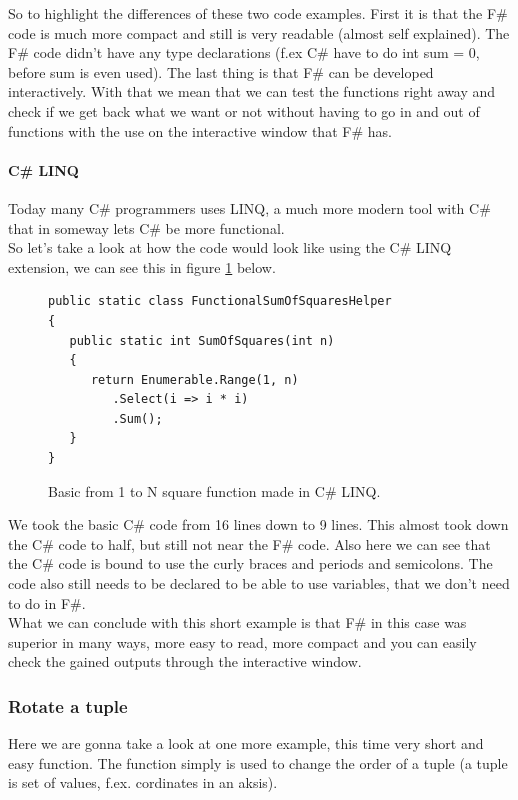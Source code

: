 \documentclass[12pt, a4paper]{article}
\begin{document}
So to highlight the differences of these two code examples. First it is that the F\# code is much more compact and still is very readable (almost self explained). The F\# code didn't have any type declarations (f.ex C\# have to do int sum = 0, before sum is even used). The last thing is that F\# can be developed interactively. With that we mean that we can test the functions right away and check if we get back what we want or not without having to go in and out of functions with the use on the interactive window that F\# has.

\newpage

\paragraph{C\# LINQ}
Today many C\# programmers uses LINQ, a much more modern tool with C\# that in someway lets C\# be more functional.\\

So let’s take a look at how the code would look like using the C\# LINQ extension, we can see this in figure \ref{fig:SquareFunctionCSharpLINQ} below.

\begin{figure}[!h]
\begin{lstlisting}
public static class FunctionalSumOfSquaresHelper
{
   public static int SumOfSquares(int n)
   {
      return Enumerable.Range(1, n)
         .Select(i => i * i)
         .Sum();
   }
}
\end{lstlisting}
\caption{Basic from 1 to N square function made in C\# LINQ.}
\label{fig:SquareFunctionCSharpLINQ}
\end{figure}

We took the basic C\# code from 16 lines down to 9 lines. This almost took down the C\# code to half, but still not near the F\# code. Also here we can see that the C\# code is bound to use the  curly braces and periods and semicolons. The code also still needs to be declared to be able to use variables, that we don’t need to do in F\#.\\

What we can conclude with this short example is that F\# in this case was superior in many ways, more easy to read, more compact and you can easily check the gained outputs through the interactive window. 

\newpage
\subsubsection{Rotate a tuple}
Here we are gonna take a look at one more example, this time very short and easy function. The function simply is used to change the order of a tuple (a tuple is set of values, f.ex. cordinates in an aksis).\\
   
\end{document}
